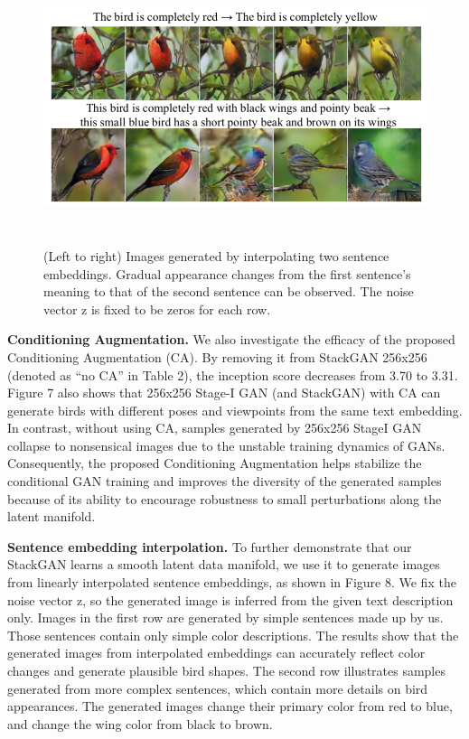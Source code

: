 \documentclass[a4paper,12pt,oneside]{article}
\begin{document}
\begin{figure}[H]
\centering
\includegraphics[height=8cm,width=15cm]{Figure8.png}
\caption[ Images generated by interpolating two sentence embeddings]{(Left to right) Images generated by interpolating two sentence embeddings. Gradual appearance changes from the first sentence’s meaning to that of the second sentence can be observed. The noise vector z is fixed to be zeros for each row.}
\end{figure}

\textbf{Conditioning Augmentation. }We also investigate the efficacy of the proposed Conditioning Augmentation (CA). By removing it from StackGAN 256x256 (denoted as “no CA” in Table 2), the inception score decreases from 3.70 to 3.31. Figure 7 also shows that 256x256 Stage-I GAN (and StackGAN) with CA can generate birds with different poses and viewpoints from the same text embedding. In contrast, without using CA, samples generated by 256x256 StageI GAN collapse to nonsensical images due to the unstable training dynamics of GANs. Consequently, the proposed Conditioning Augmentation helps stabilize the conditional GAN training and improves the diversity of the generated samples because of its ability to encourage robustness to small perturbations along the latent manifold. 

\textbf{Sentence embedding interpolation. }To further demonstrate that our StackGAN learns a smooth latent data manifold, we use it to generate images from linearly interpolated sentence embeddings, as shown in Figure 8. We fix the noise vector z, so the generated image is inferred from the given text description only. Images in the first row are generated by simple sentences made up by us. Those sentences contain only simple color descriptions. The results show that the generated images from interpolated embeddings can accurately reflect color changes and generate plausible bird shapes. The second row illustrates samples generated from more complex sentences, which contain more details on bird appearances. The generated images change their primary color from red to blue, and change the wing color from black to brown. 
\end{document}
